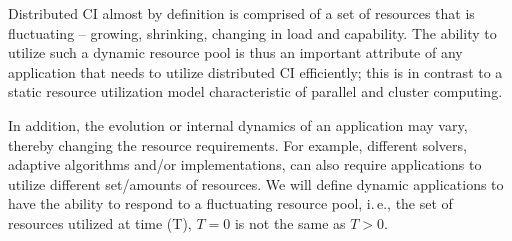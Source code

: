 \documentclass[conference,final]{IEEEtran}
\newcommand{\jhanote}[1]{ {\textcolor{red} { ***shantenu: #1 }}}
\newcommand{\alnote}[1]{ {\textcolor{blue} { ***andre: #1 }}}
\newcommand{\alnote}[1]{}
\newcommand{\jhanote}[1]{}
\begin{document}
Distributed CI almost by definition is comprised of a set of resources
that is fluctuating -- growing, shrinking, changing in load and
capability.  The ability to utilize such a dynamic resource pool is
thus an important attribute of any application that needs to utilize
distributed CI efficiently; this is in contrast to a static resource
utilization model characteristic of parallel and cluster computing.

In addition, the evolution or internal dynamics of an application may
vary, thereby changing the resource requirements.
For example, different solvers, %
adaptive algorithms and/or implementations, can also require
applications to utilize different set/amounts of resources.
We will define dynamic applications to have the ability to respond to
a fluctuating resource pool, i.\,e., the set of resources utilized at
time (T), $T=0$ is not the same as $T>0$.






\end{document}
